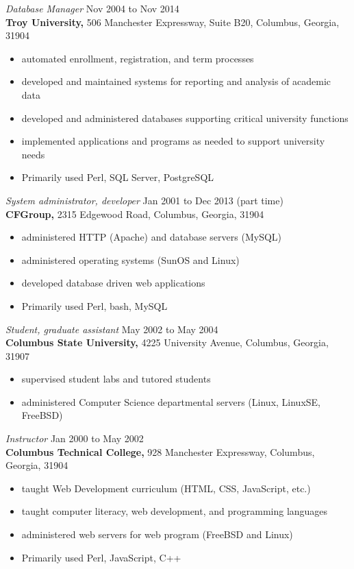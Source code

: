 \documentclass[margin, 10pt]{res} %
\begin{document}
\begin{resume}
{\it Database Manager} \hfill Nov 2004 to Nov 2014 \\
\textbf{Troy University,} 506 Manchester Expressway, Suite B20, Columbus, Georgia, 31904
\begin{itemize} \itemsep -2pt %
            \footnotesize
\item automated enrollment, registration, and term processes
\item developed and maintained systems for reporting and analysis of academic data
\item developed and administered databases supporting critical university functions 
\item implemented applications and programs as needed to support university needs 
\item Primarily used Perl, SQL Server, PostgreSQL
\end{itemize}
 
{\it System administrator, developer} \hfill Jan 2001 to Dec 2013 (part time) \\
\textbf{CFGroup,} \hfill 2315 Edgewood Road, Columbus, Georgia, 31904
\begin{itemize} \itemsep -2pt %
            \footnotesize
\item administered HTTP (Apache) and database servers (MySQL)
\item administered operating systems (SunOS and Linux)
\item developed database driven web applications
\item Primarily used Perl, bash, MySQL
\end{itemize}
 
{\it Student, graduate assistant} \hfill May 2002 to May 2004 \\
\textbf{Columbus State University,} \hfill 4225 University Avenue, Columbus, Georgia, 31907

\begin{itemize} \itemsep -2pt %
            \footnotesize
\item supervised student labs and tutored students
\item administered Computer Science departmental servers (Linux, LinuxSE, FreeBSD)
\end{itemize}

{\it Instructor} \hfill Jan 2000 to May 2002 \\
\textbf{Columbus Technical College,} \hfill 928 Manchester Expressway, Columbus, Georgia, 31904
\begin{itemize} \itemsep -2pt %
            \footnotesize
        \item taught Web Development curriculum (HTML, CSS, JavaScript, etc.)
\item taught computer literacy, web development, and programming languages
\item administered web servers for web program (FreeBSD and Linux)
\item Primarily used Perl, JavaScript, C++
\end{itemize}


\end{resume}
\end{document}
